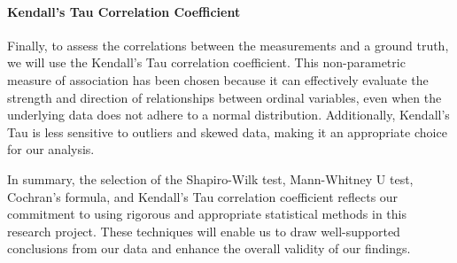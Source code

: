 \paragraph{Kendall's Tau Correlation Coefficient}
Finally, to assess the correlations between the measurements and a ground truth, we will use the Kendall's Tau correlation coefficient. This non-parametric measure of association has been chosen because it can effectively evaluate the strength and direction of relationships between ordinal variables, even when the underlying data does not adhere to a normal distribution. Additionally, Kendall's Tau is less sensitive to outliers and skewed data, making it an appropriate choice for our analysis.

In summary, the selection of the Shapiro-Wilk test, Mann-Whitney U test, Cochran's formula, and Kendall's Tau correlation coefficient reflects our commitment to using rigorous and appropriate statistical methods in this research project. These techniques will enable us to draw well-supported conclusions from our data and enhance the overall validity of our findings.